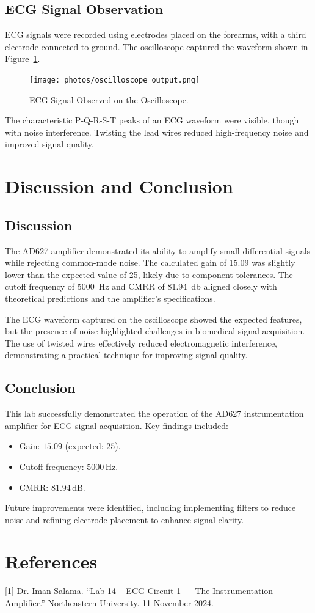 \subsection{ECG Signal Observation}
ECG signals were recorded using electrodes placed on the forearms, with a third electrode connected to ground. The oscilloscope
captured the waveform shown in Figure~\ref{fig:ecg_output}.

\begin{figure}[H]
  \centering
  \texttt{[image: photos/oscilloscope\_output.png]}
  \caption{ECG Signal Observed on the Oscilloscope.}
  \label{fig:ecg_output}
\end{figure}

The characteristic P-Q-R-S-T peaks of an ECG waveform were visible, though with noise interference. Twisting the lead wires
reduced high-frequency noise and improved signal quality.

\section{Discussion and Conclusion}

\subsection{Discussion}
The AD627 amplifier demonstrated its ability to amplify small differential signals while rejecting common-mode noise. The
calculated gain of 15.09 was slightly lower than the expected value of 25, likely due to component tolerances. The cutoff frequency
of 5000~\si{\hertz} and CMRR of 81.94~\si{\decibel} aligned closely with theoretical predictions and the amplifier's specifications.
\newline

The ECG waveform captured on the oscilloscope showed the expected features, but the presence of noise highlighted challenges in
biomedical signal acquisition. The use of twisted wires effectively reduced electromagnetic interference, demonstrating a practical
technique for improving signal quality.

\subsection{Conclusion}
This lab successfully demonstrated the operation of the AD627 instrumentation amplifier for ECG signal acquisition. Key findings
included:
\begin{itemize}
  \item Gain: \( 15.09 \) (expected: \( 25 \)).
  \item Cutoff frequency: \( 5000 \, \text{Hz} \).
  \item CMRR: \( 81.94 \, \text{dB} \).
\end{itemize}
Future improvements were identified, including implementing filters to reduce noise and refining electrode placement to enhance
signal clarity.

\section{References}
[1] Dr. Iman Salama. “Lab 14 – ECG Circuit 1 --- The Instrumentation Amplifier.” Northeastern University. 11 November 2024.


